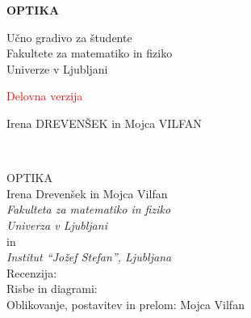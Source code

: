 \documentclass[11pt,fleqn]{book} %
\begin{document}
                
\let\cleardoublepage\clearpage
\makeatletter
\setlength{\@fptop}{0pt}
\makeatother




\begingroup
\thispagestyle{empty}
\centering
\vspace*{5cm}
\par\normalfont\fontsize{35}{35}\sffamily\selectfont
\textbf{OPTIKA}
{\LARGE }\par %
\vspace*{1cm}
{\LARGE Učno gradivo za študente \\ Fakultete za matematiko in fiziko
\\ 
Univerze v Ljubljani\\}\par %
\vspace*{1cm}
{\LARGE \textcolor{red}{Delovna verzija}\\}\par
\vspace*{8cm}
{\Large Irena DREVENŠEK in Mojca VILFAN \\}\par %
\endgroup


\newpage
~\vfill
\thispagestyle{empty}

OPTIKA \\

Irena Drevenšek in Mojca Vilfan\\
{\it Fakulteta za matematiko in fiziko\\
Univerza v Ljubljani}\\
in\\
{\it Institut ``Jožef Stefan'', Ljubljana}\\
 
 Recenzija:  \\%

 Risbe in diagrami: \\ %
 
 Oblikovanje, postavitev in prelom: Mojca Vilfan \\ %
\end{document}
